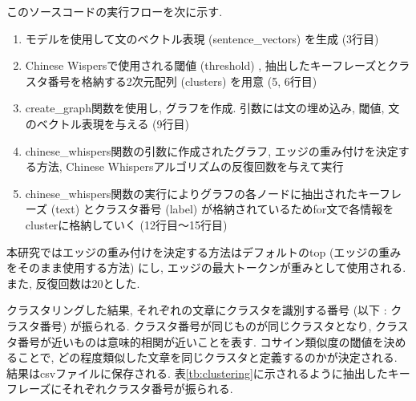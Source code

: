 このソースコードの実行フローを次に示す. 

\begin{enumerate}
  \item モデルを使用して文のベクトル表現 (sentence\_vectors) を生成 (3行目) 
  \item Chinese Wispersで使用される閾値 (threshold) , 抽出したキーフレーズとクラスタ番号を格納する2次元配列 (clusters) を用意 (5, 6行目)
  \item create\_graph関数を使用し, グラフを作成. 引数には文の埋め込み, 閾値, 文のベクトル表現を与える (9行目)
  \item chinese\_whispers関数の引数に作成されたグラフ, エッジの重み付けを決定する方法, Chinese Whispersアルゴリズムの反復回数を与えて実行
  \item chinese\_whispers関数の実行によりグラフの各ノードに抽出されたキーフレーズ (text) とクラスタ番号 (label) が格納されているためfor文で各情報をclusterに格納していく (12行目〜15行目)
\end{enumerate}

本研究ではエッジの重み付けを決定する方法はデフォルトのtop (エッジの重みをそのまま使用する方法) にし, エッジの最大トークンが重みとして使用される. また, 反復回数は20とした. 

クラスタリングした結果, それぞれの文章にクラスタを識別する番号 (以下 : クラスタ番号) が振られる. クラスタ番号が同じものが同じクラスタとなり, クラスタ番号が近いものは意味的相関が近いことを表す. コサイン類似度の閾値を決めることで, どの程度類似した文章を同じクラスタと定義するのかが決定される. 
結果はcsvファイルに保存される. 表\ref{tb:clustering}に示されるように抽出したキーフレーズにそれぞれクラスタ番号が振られる. 

